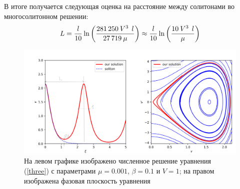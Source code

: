 \documentclass[titlepage]{article}
\begin{document}
В итоге получается следующая оценка на расстояние между солитонами во многосолитонном решении:
\begin{equation}
 {L} =  \frac{l}{10}\ln{ \qty(\dfrac{281\,250\:V^3\:\:l}{27\,719\: \mu})} 
 \approx \frac{l}{10}\ln{ \qty(\dfrac{10\:V^3\:\:l}{\mu})}
\end{equation}
\begin{figure}[h]
 \includegraphics[width = 160 mm]{plo1t.png}
 \caption{На левом графике изображено численное решение уравнения (\ref{three}) с параметрами $\mu = 0.001$, $\beta = 0.1$ и $V = 1$; на правом изображена фазовая плоскость уравнения}
 \label{sol}
\end{figure}
\end{document}

